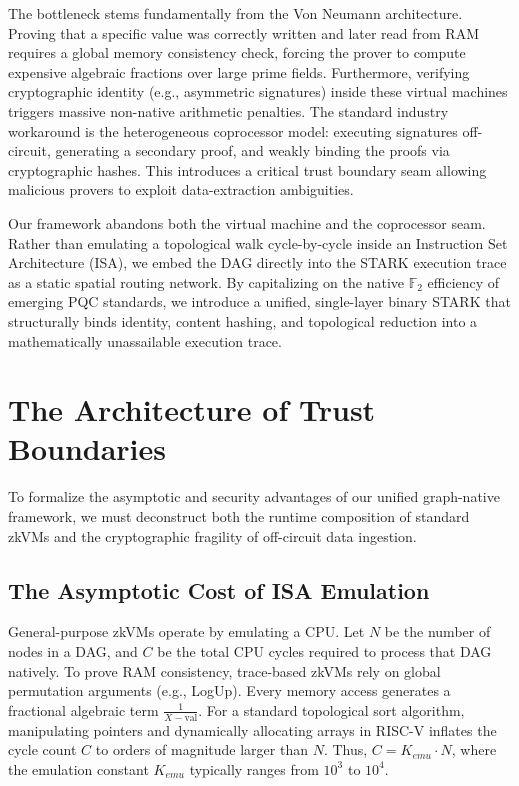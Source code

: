 \documentclass[11pt,a4paper]{article}
\begin{document}
The bottleneck stems fundamentally from the Von Neumann
architecture.  Proving that a specific value was correctly written
and later read from RAM requires a global memory consistency check,
forcing the prover to compute expensive algebraic fractions over
large prime fields.  Furthermore, verifying cryptographic identity
(e.g., asymmetric signatures) inside these virtual machines triggers
massive non-native arithmetic penalties.  The standard industry
workaround is the heterogeneous coprocessor model: executing
signatures off-circuit, generating a secondary proof, and weakly
binding the proofs via cryptographic hashes.  This introduces a
critical trust boundary seam allowing malicious provers to exploit
data-extraction ambiguities.

Our framework abandons both the virtual machine and the coprocessor
seam.  Rather than emulating a topological walk cycle-by-cycle
inside an Instruction Set Architecture (ISA), we embed the DAG
directly into the STARK execution trace as a static spatial routing
network.  By capitalizing on the native $\mathbb{F}_2$ efficiency
of emerging PQC standards, we introduce a unified, single-layer
binary STARK that structurally binds identity, content hashing, and
topological reduction into a mathematically unassailable execution
trace.


\section{The Architecture of Trust Boundaries}\label{sec:bottleneck}

To formalize the asymptotic and security advantages of our unified
graph-native framework, we must deconstruct both the runtime
composition of standard zkVMs and the cryptographic fragility of
off-circuit data ingestion.

\subsection{The Asymptotic Cost of ISA Emulation}

General-purpose zkVMs operate by emulating a CPU\@.  Let $N$ be the
number of nodes in a DAG, and $C$ be the total CPU cycles required
to process that DAG natively.  To prove RAM consistency, trace-based
zkVMs rely on global permutation arguments (e.g., LogUp).  Every
memory access generates a fractional algebraic term
$\frac{1}{X - \mathrm{val}}$.  For a standard topological sort
algorithm, manipulating pointers and dynamically allocating arrays
in RISC-V inflates the cycle count $C$ to orders of magnitude larger
than $N$.  Thus, $C = K_{emu} \cdot N$, where the emulation constant
$K_{emu}$ typically ranges from $10^3$ to $10^4$.
\end{document}
